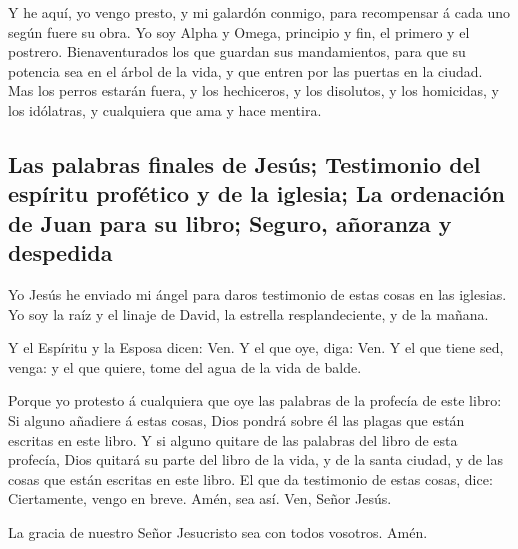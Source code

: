  Y he aquí, yo vengo presto, y mi galardón conmigo, para
recompensar á cada uno según fuere su obra.  Yo soy Alpha
y Omega, principio y fin, el primero y el postrero. 
Bienaventurados los que guardan sus mandamientos, para que su potencia
sea en el árbol de la vida, y que entren por las puertas en la ciudad.
 Mas los perros estarán fuera, y los hechiceros, y los
disolutos, y los homicidas, y los idólatras, y cualquiera que ama y hace
mentira.

\hypertarget{las-palabras-finales-de-jesuxfas-testimonio-del-espuxedritu-profuxe9tico-y-de-la-iglesia-la-ordenaciuxf3n-de-juan-para-su-libro-seguro-auxf1oranza-y-despedida}{%
\subsection{Las palabras finales de Jesús; Testimonio del espíritu
profético y de la iglesia; La ordenación de Juan para su libro; Seguro,
añoranza y
despedida}\label{las-palabras-finales-de-jesuxfas-testimonio-del-espuxedritu-profuxe9tico-y-de-la-iglesia-la-ordenaciuxf3n-de-juan-para-su-libro-seguro-auxf1oranza-y-despedida}}

 Yo Jesús he enviado mi ángel para daros testimonio de
estas cosas en las iglesias. Yo soy la raíz y el linaje de David, la
estrella resplandeciente, y de la mañana.

 Y el Espíritu y la Esposa dicen: Ven. Y el que oye,
diga: Ven. Y el que tiene sed, venga: y el que quiere, tome del agua de
la vida de balde.

 Porque yo protesto á cualquiera que oye las palabras de
la profecía de este libro: Si alguno añadiere á estas cosas, Dios pondrá
sobre él las plagas que están escritas en este libro.  Y
si alguno quitare de las palabras del libro de esta profecía, Dios
quitará su parte del libro de la vida, y de la santa ciudad, y de las
cosas que están escritas en este libro.  El que da
testimonio de estas cosas, dice: Ciertamente, vengo en breve. Amén, sea
así. Ven, Señor Jesús.

 La gracia de nuestro Señor Jesucristo sea con todos
vosotros. Amén.
